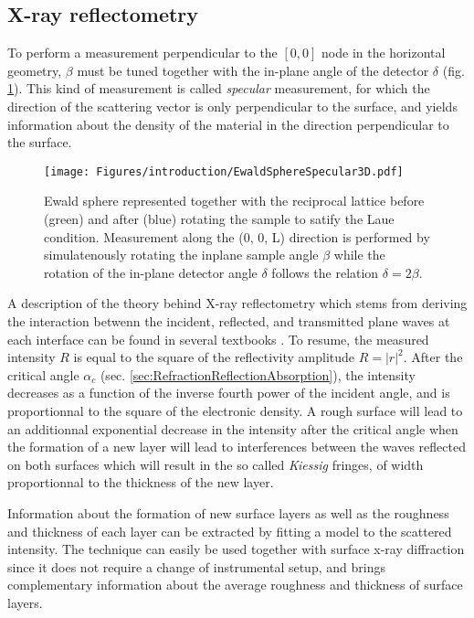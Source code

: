 \subsection{X-ray reflectometry}\label{sec:XRR}

To perform a measurement perpendicular to the $[0, 0]$ node in the horizontal geometry, $\beta$ must be tuned together with the in-plane angle of the detector $\delta$ (fig. \ref{fig:EwaldSphereSpecular}).
This kind of measurement is called \textit{specular} measurement, for which the direction of the scattering vector is only perpendicular to the surface, and yields information about the density of the material in the direction perpendicular to the surface.

\begin{figure}[!htb]
    \centering
    \texttt{[image: Figures/introduction/EwaldSphereSpecular3D.pdf]}
    \caption{
    Ewald sphere represented together with the reciprocal lattice before (green) and after (blue) rotating the sample to satify the Laue condition.
    Measurement along the (0, 0, L) direction is performed by simulatenously rotating the inplane sample angle $\beta$ while the rotation of the in-plane detector angle $\delta$ follows the relation $\delta=2\beta$.
    }
    \label{fig:EwaldSphereSpecular}
\end{figure}

A description of the theory behind X-ray reflectometry which stems from deriving the interaction betwenn the incident, reflected, and transmitted plane waves at each interface can be found in several textbooks \parencite{Willmott}.
To resume, the measured intensity $R$ is equal to the square of the reflectivity amplitude $R=|r|^2$.
After the critical angle $\alpha_c$ (sec. \ref{sec:RefractionReflectionAbsorption}), the intensity decreases as a function of the inverse fourth power of the incident angle, and is proportionnal to the square of the electronic density.
A rough surface will lead to an additionnal exponential decrease in the intensity after the critical angle when the formation of a new layer will lead to interferences between the waves reflected on both surfaces which will result in the so called \textit{Kiessig} fringes, of width proportionnal to the thickness of the new layer.

Information about the formation of new surface layers as well as the roughness and thickness of each layer can be extracted by fitting a model to the scattered intensity.
The technique can easily be used together with surface x-ray diffraction since it does not require a change of instrumental setup, and brings complementary information about the average roughness and thickness of surface layers.